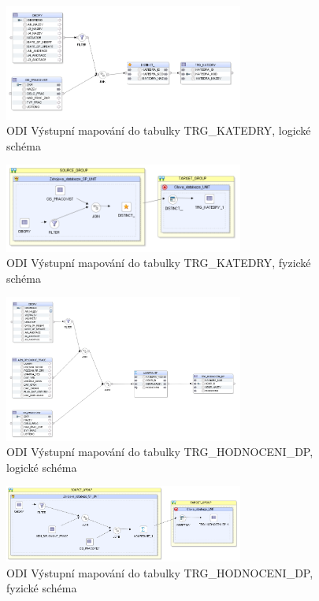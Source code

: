 \begin{figure}[htb]
    \centering
    \includegraphics[width=0.7\textwidth]{graphs/odi-mapping-trg-katedry.png}
    \caption{ODI Výstupní mapování do tabulky TRG\_KATEDRY, logické schéma}
    \label{fig:odi-mapping-trg-katedry}
\end{figure}
\FloatBarrier

\begin{figure}[htb]
    \centering
    \includegraphics[width=0.7\textwidth]{graphs/odi-mapping-trg-katedry-physical.png}
    \caption{ODI Výstupní mapování do tabulky TRG\_KATEDRY, fyzické schéma}
    \label{fig:odi-mapping-trg-katedry-physical}
\end{figure}
\FloatBarrier

\begin{figure}[htb]
    \centering
    \includegraphics[width=0.7\textwidth]{graphs/odi-mapping-trg-hodnoceni-dp.png}
    \caption{ODI Výstupní mapování do tabulky TRG\_HODNOCENI\_DP, logické schéma}
    \label{fig:odi-mapping-trg-hodnoceni}
\end{figure}
\FloatBarrier

\begin{figure}[htb]
    \centering
    \includegraphics[width=0.7\textwidth]{graphs/odi-mapping-trg-hodnoceni-dp-physical.png}
    \caption{ODI Výstupní mapování do tabulky TRG\_HODNOCENI\_DP, fyzické schéma}
    \label{fig:odi-mapping-trg-hodnoceni-physical}
\end{figure}
\FloatBarrier


